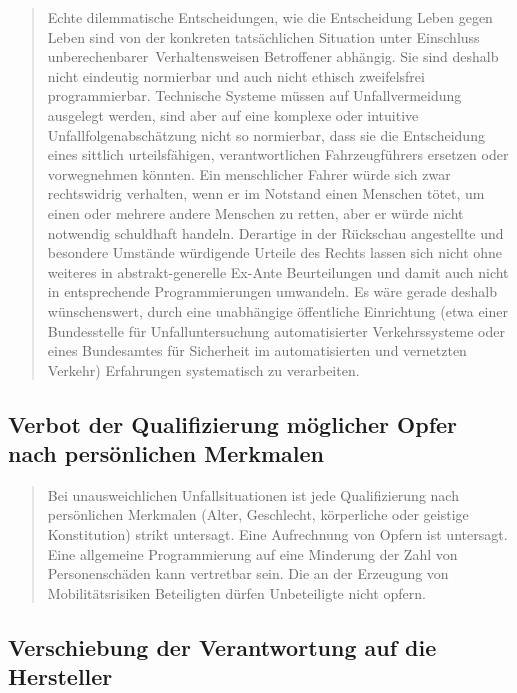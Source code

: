 \documentclass[twoside,a4paper,12pt]{article}
\begin{document}
\begin{quote}
\glqq
Echte dilemmatische Entscheidungen, wie die Entscheidung Leben gegen Leben sind von
der konkreten tatsächlichen Situation unter Einschluss \glqq unberechenbarer\grqq\ Verhaltensweisen Betroffener abhängig. 
Sie sind deshalb nicht eindeutig normierbar und auch nicht
ethisch zweifelsfrei programmierbar. Technische Systeme müssen auf Unfallvermeidung
ausgelegt werden, sind aber auf eine komplexe oder intuitive Unfallfolgenabschätzung
nicht so normierbar, dass sie die Entscheidung eines sittlich urteilsfähigen, verantwortlichen Fahrzeugführers ersetzen 
oder vorwegnehmen könnten. Ein menschlicher Fahrer
würde sich zwar rechtswidrig verhalten, wenn er im Notstand einen Menschen tötet, um
einen oder mehrere andere Menschen zu retten, aber er würde nicht notwendig schuldhaft handeln. Derartige in der Rückschau 
angestellte und besondere Umstände würdigende Urteile des Rechts lassen sich nicht ohne weiteres in abstrakt-generelle 
Ex-Ante Beurteilungen und damit auch nicht in entsprechende Programmierungen umwandeln.
Es wäre gerade deshalb wünschenswert, durch eine unabhängige öffentliche Einrichtung
(etwa einer Bundesstelle für Unfalluntersuchung automatisierter Verkehrssysteme oder
eines Bundesamtes für Sicherheit im automatisierten und vernetzten Verkehr) Erfahrungen systematisch zu verarbeiten.\grqq\mbox{~\cite[S. 11]{ek}}
\end{quote}

\subsection{Verbot der Qualifizierung möglicher Opfer nach persönlichen Merkmalen} \label{VerbotDerQualifizierungMoeglicherOpferNachPersönlichenMerkmalen}

\begin{quote}
\glqq
Bei unausweichlichen Unfallsituationen ist jede Qualifizierung nach persönlichen Merkmalen (Alter, Geschlecht, 
körperliche oder geistige Konstitution) strikt untersagt. Eine
Aufrechnung von Opfern ist untersagt. Eine allgemeine Programmierung auf eine Minderung der Zahl von Personenschäden 
kann vertretbar sein. Die an der Erzeugung von
Mobilitätsrisiken Beteiligten dürfen Unbeteiligte nicht opfern.\grqq\mbox{~\cite[S. 11]{ek}}
\end{quote}

\subsection{Verschiebung der Verantwortung auf die Hersteller} \label{VerschiebungDerVerantwortungAufDieHersteller}
\end{document}
